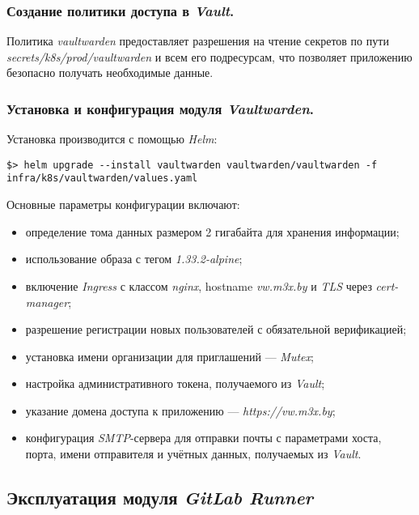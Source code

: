 \subsubsection{Создание политики доступа в \textit{Vault}.} Политика \textit{vaultwarden} предоставляет разрешения на чтение секретов по пути \textit{secrets/k8s/prod/vaultwarden} и всем его подресурсам, что позволяет приложению безопасно получать необходимые данные.

\subsubsection{Установка и конфигурация модуля \textit{Vaultwarden}.} Установка производится с помощью \textit{Helm}:

\begin{lstlisting}
$> helm upgrade --install vaultwarden vaultwarden/vaultwarden -f infra/k8s/vaultwarden/values.yaml
\end{lstlisting}

Основные параметры конфигурации включают:

\begin{itemize}
    \item определение тома данных размером 2 гигабайта для хранения информации;
    \item использование образа с тегом \textit{1.33.2-alpine};
    \item включение \textit{Ingress} с классом \textit{nginx}, hostname \textit{vw.m3x.by} и \textit{TLS} через \textit{cert-manager};
    \item разрешение регистрации новых пользователей с обязательной верификацией;
    \item установка имени организации для приглашений — \textit{Mutex};
    \item настройка административного токена, получаемого из \textit{Vault};
    \item указание домена доступа к приложению — \textit{https://vw.m3x.by};
    \item конфигурация \textit{SMTP}-сервера для отправки почты с параметрами хоста, порта, имени отправителя и учётных данных, получаемых из \textit{Vault}.
\end{itemize}



\subsection{Эксплуатация модуля \textit{GitLab Runner}}

